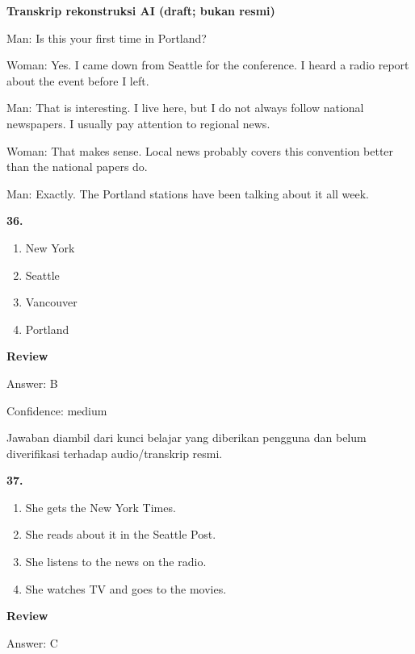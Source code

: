 \documentclass[12pt]{article}
\begin{document}
\begin{exampleblock}
\textbf{Transkrip rekonstruksi AI (draft; bukan resmi)}\par
Man: Is this your first time in Portland?\par
Woman: Yes. I came down from Seattle for the conference. I heard a radio report about the event before I left.\par
Man: That is interesting. I live here, but I do not always follow national newspapers. I usually pay attention to regional news.\par
Woman: That makes sense. Local news probably covers this convention better than the national papers do.\par
Man: Exactly. The Portland stations have been talking about it all week.\par
\end{exampleblock}
\noindent\textbf{36.}
\begin{enumerate}[label=(\Alph*),leftmargin=*,itemsep=0.2em]
\item New York
\item Seattle
\item Vancouver
\item Portland
\end{enumerate}
\par
\begingroup
\setlength{\parskip}{0pt}
\setlength{\parindent}{0pt}
\textbf{Review}\par
Answer: B\par
Confidence: medium\par
Jawaban diambil dari kunci belajar yang diberikan pengguna dan belum diverifikasi terhadap audio/transkrip resmi.\par
\endgroup
\par
\vspace{0.25\baselineskip}
\noindent\textbf{37.}
\begin{enumerate}[label=(\Alph*),leftmargin=*,itemsep=0.2em]
\item She gets the New York Times.
\item She reads about it in the Seattle Post.
\item She listens to the news on the radio.
\item She watches TV and goes to the movies.
\end{enumerate}
\par
\begingroup
\setlength{\parskip}{0pt}
\setlength{\parindent}{0pt}
\textbf{Review}\par
Answer: C\par
\end{document}
